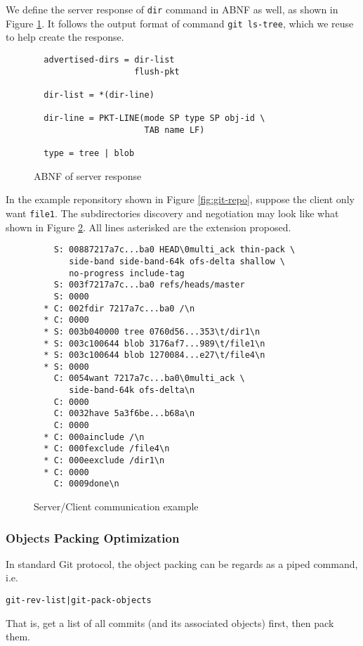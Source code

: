 \documentclass[preprint]{sigplanconf}
\begin{document}
We define the server response of \verb|dir| command in ABNF as well, as shown
in Figure \ref{fig:server-response-ABNF}.
It follows the output format of command \verb|git ls-tree|, which we reuse to
help create the response.
\begin{figure}[htpb]
  \centering
  \begin{verbatim}
  advertised-dirs = dir-list
                    flush-pkt

  dir-list = *(dir-line)

  dir-line = PKT-LINE(mode SP type SP obj-id \
                      TAB name LF)

  type = tree | blob
  \end{verbatim}
  \caption{ABNF of server response}
  \label{fig:server-response-ABNF}
\end{figure}

In the example reponsitory shown in Figure \ref{fig:git-repo}, suppose the
client only want \verb|file1|.
The subdirectories discovery and negotiation may look like what shown in Figure
\ref{fig:c/s-comm}.
All lines asterisked are the extension proposed.

\begin{figure}[htpb]
  \centering
  \begin{verbatim}
    S: 00887217a7c...ba0 HEAD\0multi_ack thin-pack \
       side-band side-band-64k ofs-delta shallow \
       no-progress include-tag
    S: 003f7217a7c...ba0 refs/heads/master
    S: 0000
  * C: 002fdir 7217a7c...ba0 /\n
  * C: 0000
  * S: 003b040000 tree 0760d56...353\t/dir1\n
  * S: 003c100644 blob 3176af7...989\t/file1\n
  * S: 003c100644 blob 1270084...e27\t/file4\n
  * S: 0000
    C: 0054want 7217a7c...ba0\0multi_ack \
       side-band-64k ofs-delta\n
    C: 0000
    C: 0032have 5a3f6be...b68a\n
    C: 0000
  * C: 000ainclude /\n
  * C: 000fexclude /file4\n
  * C: 000eexclude /dir1\n
  * C: 0000
    C: 0009done\n
  \end{verbatim}
  \caption{Server/Client communication example}
  \label{fig:c/s-comm}
\end{figure}

\subsubsection{Objects Packing Optimization}
In standard Git protocol, the object packing can be regards as a piped command, i.e.
\begin{verbatim}
git-rev-list|git-pack-objects
\end{verbatim}
That is, get a list of all commits (and its associated objects) first, then pack them.
\end{document}
